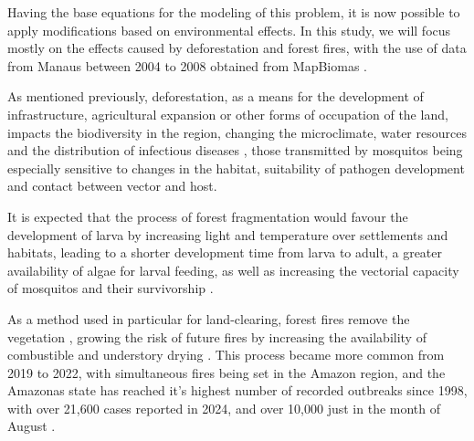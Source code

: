 \documentclass[a4paper,fleqn]{cas-dc}
\begin{document}
Having the base equations for the modeling of this problem, it is now possible to apply modifications based on environmental effects. In this study, we will focus mostly on the effects caused by deforestation and forest fires, with the use of data from Manaus between 2004 to 2008 obtained from MapBiomas \cite{MapBIOMAS_Deforestation, MapBIOMAS_Forest_Fires}. 

As mentioned previously, deforestation, as a means for the development of infrastructure, agricultural expansion or other forms of occupation of the land, impacts the biodiversity in the region, changing the microclimate, water resources and the distribution of infectious diseases \cite{Reconstructing_Three_Decades, Amazon_Defor_Drives_Malaria_Transmis}, those transmitted by mosquitos being especially sensitive to changes in the habitat, suitability of pathogen development and contact between vector and host.

It is expected that the process of forest fragmentation would favour the development of larva by increasing light and temperature over settlements and habitats, leading to a shorter development time from larva to adult, a greater availability of algae for larval feeding, as well as increasing the vectorial capacity of mosquitos and their survivorship \cite{Alteracoes_Ambientais, Anthropogenic_Landscape}.

As a method used in particular for land-clearing, forest fires remove the vegetation \cite{Future_of_Deforestation, Relationship_between_fires_and_defor}, growing the risk of future fires by increasing the availability of combustible and understory drying \cite{Conservation_Policy}. This process became more common from 2019 to 2022, with simultaneous fires being set in the Amazon region, and the Amazonas state has reached it's highest number of recorded outbreaks since 1998, with over 21,600 cases reported in 2024, and over 10,000 just in the month of August \cite{Threats_and_Opportunities, G1_Queimadas}.
\end{document}
